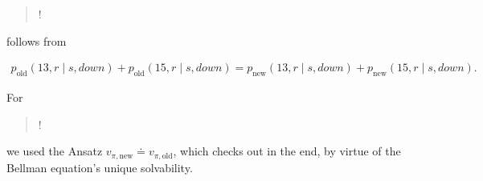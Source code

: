 \begin{solution}
\begin{enumerate}[label = \arabic*.]
    \blockquote{!} follows from

    \begin{align*}
        p_\text{old}(13, r \mid s, \mathit{down})
        +
        p_\text{old}(15, r \mid s, \mathit{down})
        =
        p_\text{new}(13, r \mid s, \mathit{down})
        +
        p_\text{new}(15, r \mid s, \mathit{down}).
    \end{align*}

    For \blockquote{!} we used the Ansatz $v_{\pi, \text{new}} \doteq v_{\pi, \text{old}}$, which checks out in the end, by virtue of the Bellman equation's unique solvability.

\end{enumerate}

\end{solution}


